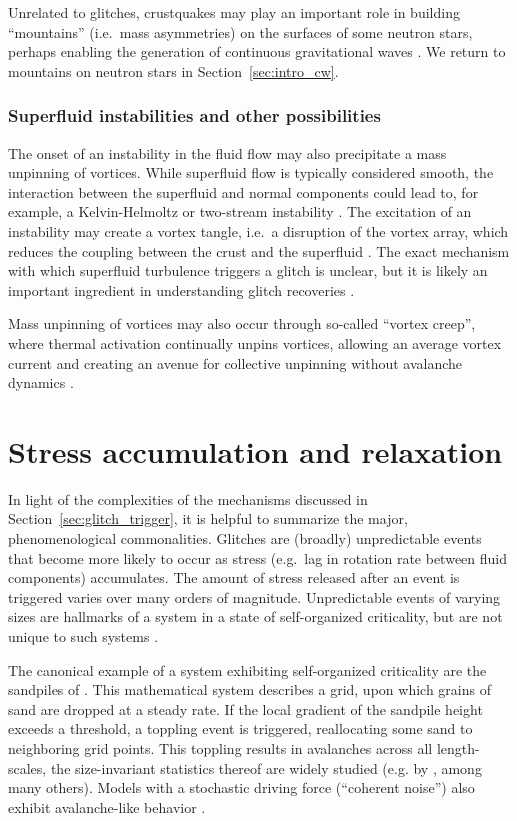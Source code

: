 Unrelated to glitches, crustquakes may play an important role in building ``mountains'' (i.e.~mass asymmetries) on the surfaces of some neutron stars, perhaps enabling the generation of continuous gravitational waves \citep{Ushomirsky2000,Gittins2021,Kerin2022}. We return to mountains on neutron stars in Section~\ref{sec:intro_cw}.

\subsubsection{Superfluid instabilities and other possibilities}
The onset of an instability in the fluid flow may also precipitate a mass unpinning of vortices. While superfluid flow is typically considered smooth, the interaction between the superfluid and normal components could lead to, for example, a Kelvin-Helmoltz \citep{Mastrano2005} or two-stream instability \citep{Andersson2003,Andersson2004}. The excitation of an instability may create a vortex tangle, i.e.~a disruption of the vortex array, which reduces the coupling between the crust and the superfluid \citep{Peralta2006}. The exact mechanism with which superfluid turbulence triggers a glitch is unclear, but it is likely an important ingredient in understanding glitch recoveries \citep{Andersson2007,Mongiovi2017,Haskell2020}.

Mass unpinning of vortices may also occur through so-called ``vortex creep'', where thermal activation continually unpins vortices, allowing an average vortex current and creating an avenue for collective unpinning without avalanche dynamics \citep{Alpar1984,Melatos2009,Gugercinoglu2014,Gugercinoglu2019}. 

\section{Stress accumulation and relaxation} \label{sec:intro_stress}
In light of the complexities of the mechanisms discussed in Section~\ref{sec:glitch_trigger}, it is helpful to summarize the major, phenomenological commonalities. Glitches are (broadly) unpredictable events that become more likely to occur as stress (e.g.~lag in rotation rate between fluid components) accumulates. The amount of stress released after an event is triggered varies over many orders of magnitude. Unpredictable events of varying sizes are hallmarks of a system in a state of self-organized criticality, but are not unique to such systems \citep{Jensen1998,Watkins2015}. 

The canonical example of a system exhibiting self-organized criticality are the sandpiles of \citet{Bak1987,Bak1988}. This mathematical system describes a grid, upon which grains of sand are dropped at a steady rate. If the local gradient of the sandpile height exceeds a threshold, a toppling event is triggered, reallocating some sand to neighboring grid points. This toppling results in avalanches across all length-scales, the size-invariant statistics thereof are widely studied (e.g. by \citet{Hwa1992,Rosendahl1993,DeMenech2000,Lippiello2010}, among many others). Models with a stochastic driving force (``coherent noise'') also exhibit avalanche-like behavior \citep{Newman1996,Sneppen1997,Melatos2009,Sarlis2012}.

